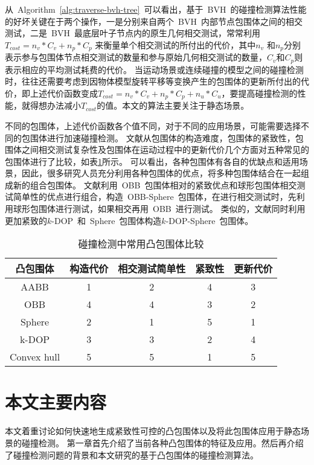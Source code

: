 从~Algorithm~\ref{alg:traverse-bvh-tree}~可以看出，基于~BVH~的碰撞检测算法性能的好坏关键在于两个操作，一是分别来自两个~BVH~内部节点包围体之间的相交测试，二是~BVH~最底层叶子节点内的原生几何相交测试，常常利用~$T_{cost}
= n_v * C_v + n_p * C_p$ 来衡量单个相交测试的所付出的代价，其中$n_v$
和$n_p$分别表示参与包围体节点相交测试的数量和参与原始几何相交测试的数量，$C_v$和$C_p$则表示相应的平均测试耗费的代价\cite{klosowski1998efficient}。
当运动场景或连续碰撞的模型之间的碰撞检测时，往往还需要考虑到因物体模型旋转平移等变换产生的包围体的更新所付出的代价，即上述代价函数变成$T_{cost}
= n_v * C_v + n_p * C_p + n_u *
C_u$，要提高碰撞检测的性能，就得想办法减小$T_{cost}$的值。本文的算法主要关注于静态场景。

不同的包围体，上述代价函数各个值不同，对于不同的应用场景，可能需要选择不同的包围体进行加速碰撞检测。
文献从包围体的构造难度，包围体的紧致性，包围体之间相交测试复杂性及包围体在运动过程中的更新代价几个方面对五种常见的包围体进行了比较，如表\ref{lbl:table:bv-comp}所示。
可以看出，各种包围体有各自的优缺点和适用场景，因此，很多研究人员充分利用各种包围体的优点，将多种包围体结合在一起组成新的组合包围体。
文献\cite{chang2010efficient}利用~OBB~包围体相对的紧致优点和球形包围体相交测试简单性的优点进行组合，构造~OBB-Sphere~包围体，在进行相交测试时，先利用球形包围体进行测试，如果相交再用~OBB~进行测试。
类似的，文献\cite{zhigang2010efficient}同时利用更加紧致的$k$-DOP~和~Sphere~包围体构造$k$-DOP-Sphere~包围体。

\begin{table}[H]
\centering
\caption{碰撞检测中常用凸包围体比较}
\begin{tabular*}{13cm}{ccccc}
\toprule[1.2pt]
凸包围体 & 构造代价 & 相交测试简单性 & 紧致性 & 更新代价\\
\midrule[1pt]
AABB   & 1 & 2 & 4 & 3\\
OBB    & 4 & 4 & 3 & 2\\
Sphere & 2 & 1 & 5 & 1\\
k-DOP  & 3 & 3 & 2 & 4\\
Convex hull & 5 & 5 & 1 & 5 \\
\bottomrule[1.2pt]
\end{tabular*}
\label{lbl:table:bv-comp}
\end{table}


\section{本文主要内容}
\label{sec:structure}
本文着重讨论如何快速地生成紧致性可控的凸包围体以及将此包围体应用于静态场景的碰撞检测。
第一章首先介绍了当前各种凸包围体的特征及应用。然后再介绍了碰撞检测问题的背景和本文研究的基于凸包围体的碰撞检测算法。

